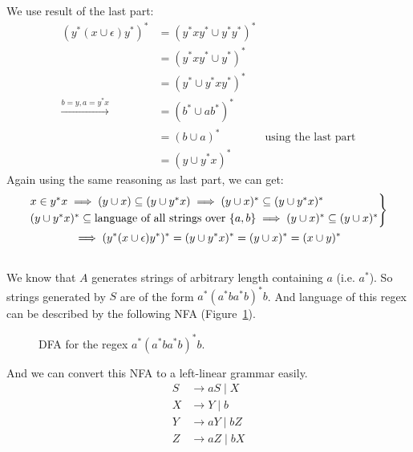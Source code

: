 \documentclass{article}
\numberwithin{equation}{subsection}
\begin{document}
\subsubsection{}
We use result of the last part:
\begin{align}
(y^*(x\cup \epsilon) y^*)^* &= (y^*xy^* \cup y^* y^*)^*\\
&= (y^*xy^* \cup y^*)^*\\
&= (y^* \cup y^*xy^*)^*\\
\xrightarrow{b = y, a = y^*x}&= (b^* \cup ab^*)^*\\
&= (b \cup a)^* & \text{using the last part}\\
&= (y \cup y^*x)^*
\end{align}
Again using the same reasoning as last part, we can get:
\begin{gather}
\begin{rcases*}
x \in y^*x \implies (y \cup x) \subseteq (y \cup y^*x) \implies (y \cup x)^* \subseteq (y \cup y^*x)^*\\
(y \cup y^*x)^* \subseteq \text{language of all strings over \(\{a, b\}\)} \implies (y \cup x)^* \subseteq (y \cup x)^*
\end{rcases*}\\
\implies (y^*(x\cup \epsilon) y^*)^* = (y \cup y^*x)^* = (y \cup x)^* = (x\cup y)^*
\end{gather}

\subsection{}
\subsubsection{}
We know that \(A\) generates strings of arbitrary length containing \(a\) (i.e. \(a^*\)).
So strings generated by \(S\) are of the form \(a^*(a^*ba^*b)^*b\).
And language of this regex can be described by the following NFA (Figure~\ref{fig:automata3-4-a}).
\begin{figure}[H]
\centering

\caption{DFA for the regex \(a^*(a^*ba^*b)^*b\).}
\label{fig:automata3-4-a}
\end{figure}
And we can convert this NFA to a left-linear grammar easily.
\begin{equation}
\begin{aligned}
    S &\rightarrow aS \mid X\\
    X &\rightarrow Y \mid b\\
    Y &\rightarrow aY \mid bZ\\
    Z &\rightarrow  aZ \mid b X
\end{aligned}
\end{equation}
\end{document}
